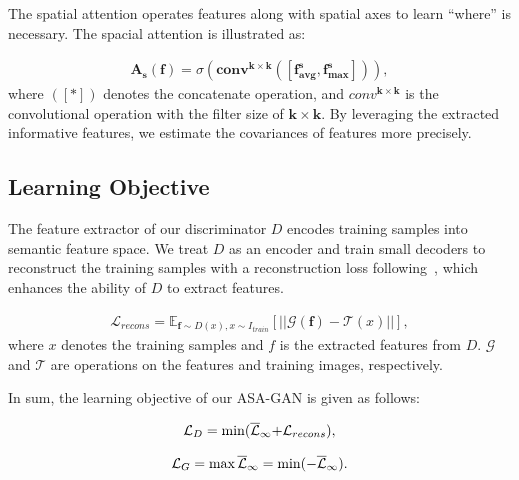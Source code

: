 \documentclass[10pt,journal,compsoc]{IEEEtran}
\begin{document}
The spatial attention operates features along with spatial axes to learn ``where'' is necessary. The spacial attention is illustrated as:

\vspace{-4mm}
\begin{equation}
\begin{aligned}
\mathbf{A}_{\mathbf{s}}(\mathbf{f})=\sigma\left(\mathbf{conv^{k \times k}}([\mathbf{f}_{\mathbf{avg}}^{\mathbf{s}},\mathbf{f}_{\mathbf{max}}^{\mathbf{s}}])\right),
\end{aligned}
\end{equation}
where $([*])$ denotes the concatenate operation, and $conv^{\mathbf{k \times k}}$ is the convolutional operation with the filter size of $\mathbf{k \times k}$.
By leveraging the extracted informative features, we estimate the covariances of features more precisely.

\subsection{Learning Objective}
\label{Objective}
The feature extractor of our discriminator $D$ encodes training samples into semantic feature space.
We treat $D$ as an encoder and train small decoders to reconstruct the training samples with a reconstruction loss following~\cite{liu2021towards}, which enhances the ability of $D$ to extract features.

\begin{equation}
\begin{aligned}
\mathcal{L}_{recons}=\mathbb{E}_{\mathbf{f} \sim D(x), x \sim I_{train}}[||\mathcal{G}(\mathbf{f})-\mathcal{T}(x)||],
\end{aligned}
\end{equation}
where $x$ denotes the training samples and $f$ is the extracted features from $D$. $\mathcal{G}$ and $\mathcal{T}$ are operations on the features and training images, respectively.

In sum, the learning objective of our ASA-GAN is given as follows:

\vspace{-3mm}
\begin{equation}
\begin{aligned}
\label{eq:discriminator}
{{\cal L}_D} = \min ({\overline {\cal L} _\infty }{\rm{ + }}{ \cal L} _{recons}),
\end{aligned}
\end{equation}

\vspace{-5mm}
\begin{equation}
\begin{aligned}
\label{eq:generator}
{{\cal L}_G} = \max {\overline {\cal L} _\infty } = \min ({- \overline {\cal L} _\infty}).
\end{aligned}
\end{equation}
\vspace{-5mm}
\end{document}
